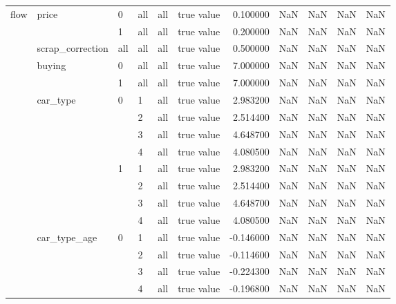 \begin{tabular}{llllllrrrrr}
\multirow[t]{37}{*}{flow} & \multirow[t]{2}{*}{price} & 0 & all & all & true value & 0.100000 & NaN & NaN & NaN & NaN \\
\cline{3-11} \cline{4-11} \cline{5-11}
 &  & 1 & all & all & true value & 0.200000 & NaN & NaN & NaN & NaN \\
\cline{2-11} \cline{3-11} \cline{4-11} \cline{5-11}
 & scrap_correction & all & all & all & true value & 0.500000 & NaN & NaN & NaN & NaN \\
\cline{2-11} \cline{3-11} \cline{4-11} \cline{5-11}
 & \multirow[t]{2}{*}{buying} & 0 & all & all & true value & 7.000000 & NaN & NaN & NaN & NaN \\
\cline{3-11} \cline{4-11} \cline{5-11}
 &  & 1 & all & all & true value & 7.000000 & NaN & NaN & NaN & NaN \\
\cline{2-11} \cline{3-11} \cline{4-11} \cline{5-11}
 & \multirow[t]{8}{*}{car_type} & \multirow[t]{4}{*}{0} & 1 & all & true value & 2.983200 & NaN & NaN & NaN & NaN \\
\cline{4-11} \cline{5-11}
 &  &  & 2 & all & true value & 2.514400 & NaN & NaN & NaN & NaN \\
\cline{4-11} \cline{5-11}
 &  &  & 3 & all & true value & 4.648700 & NaN & NaN & NaN & NaN \\
\cline{4-11} \cline{5-11}
 &  &  & 4 & all & true value & 4.080500 & NaN & NaN & NaN & NaN \\
\cline{3-11} \cline{4-11} \cline{5-11}
 &  & \multirow[t]{4}{*}{1} & 1 & all & true value & 2.983200 & NaN & NaN & NaN & NaN \\
\cline{4-11} \cline{5-11}
 &  &  & 2 & all & true value & 2.514400 & NaN & NaN & NaN & NaN \\
\cline{4-11} \cline{5-11}
 &  &  & 3 & all & true value & 4.648700 & NaN & NaN & NaN & NaN \\
\cline{4-11} \cline{5-11}
 &  &  & 4 & all & true value & 4.080500 & NaN & NaN & NaN & NaN \\
\cline{2-11} \cline{3-11} \cline{4-11} \cline{5-11}
 & \multirow[t]{8}{*}{car_type_age} & \multirow[t]{4}{*}{0} & 1 & all & true value & -0.146000 & NaN & NaN & NaN & NaN \\
\cline{4-11} \cline{5-11}
 &  &  & 2 & all & true value & -0.114600 & NaN & NaN & NaN & NaN \\
\cline{4-11} \cline{5-11}
 &  &  & 3 & all & true value & -0.224300 & NaN & NaN & NaN & NaN \\
\cline{4-11} \cline{5-11}
 &  &  & 4 & all & true value & -0.196800 & NaN & NaN & NaN & NaN \\

\end{tabular}
